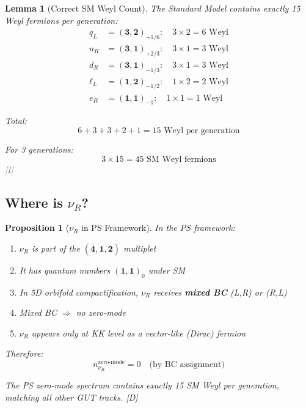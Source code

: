 \documentclass[11pt,a4paper]{article}
\newtheorem{lemma}[theorem]{Lemma}
\newtheorem{proposition}[theorem]{Proposition}
\newcommand{\tagD}{\textcolor{blue!70!black}{[D]}}
\newcommand{\tagI}{\textcolor{gray}{[I]}}
\begin{document}
\begin{lemma}[Correct SM Weyl Count]
\label{lem:correct-count}
The Standard Model contains exactly 15 Weyl fermions per generation:
\begin{align}
\label{eq:count-qL}
q_L &= (\mathbf{3}, \mathbf{2})_{+1/6}: \quad 3 \times 2 = 6 \text{ Weyl} \\
\label{eq:count-uR}
u_R &= (\mathbf{3}, \mathbf{1})_{+2/3}: \quad 3 \times 1 = 3 \text{ Weyl} \\
\label{eq:count-dR}
d_R &= (\mathbf{3}, \mathbf{1})_{-1/3}: \quad 3 \times 1 = 3 \text{ Weyl} \\
\label{eq:count-lL}
\ell_L &= (\mathbf{1}, \mathbf{2})_{-1/2}: \quad 1 \times 2 = 2 \text{ Weyl} \\
\label{eq:count-eR}
e_R &= (\mathbf{1}, \mathbf{1})_{-1}: \quad 1 \times 1 = 1 \text{ Weyl}
\end{align}

Total:
\begin{equation}
\label{eq:count-total}
6 + 3 + 3 + 2 + 1 = 15 \text{ Weyl per generation}
\end{equation}

For 3 generations:
\begin{equation}
\label{eq:count-3gen}
\boxed{3 \times 15 = 45 \text{ SM Weyl fermions}}
\end{equation}
\tagI
\end{lemma}

\subsection{Where is $\nu_R$?}

\begin{proposition}[$\nu_R$ in PS Framework]
\label{prop:nuR-fate}
In the PS framework:
\begin{enumerate}
    \item $\nu_R$ is part of the $(\bar{\mathbf{4}}, \mathbf{1}, \mathbf{2})$ multiplet
    \item It has quantum numbers $(\mathbf{1}, \mathbf{1})_0$ under SM
    \item In 5D orbifold compactification, $\nu_R$ receives \textbf{mixed BC} (L,R) or (R,L)
    \item Mixed BC $\Rightarrow$ no zero-mode
    \item $\nu_R$ appears only at KK level as a vector-like (Dirac) fermion
\end{enumerate}

Therefore:
\begin{equation}
\label{eq:nuR-zero-mode}
n_{\nu_R}^{\text{zero-mode}} = 0 \quad \text{(by BC assignment)}
\end{equation}

The PS zero-mode spectrum contains exactly 15 SM Weyl per generation, matching all other GUT tracks.
\tagD
\end{proposition}
\end{document}

